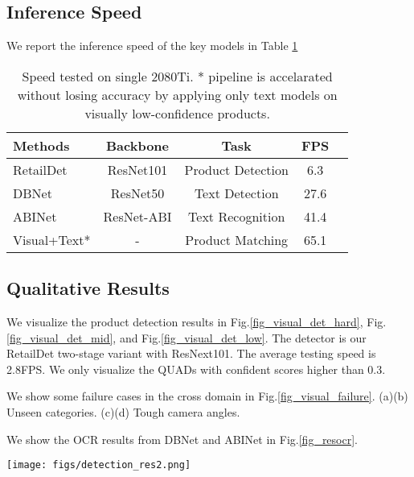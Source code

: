\documentclass[runningheads]{llncs}
\begin{document}
\subsection{Inference Speed}
We report the inference speed of the key models in Table \ref{table:Inferencetime}
\begin{table}[]
\centering
\begin{tabular}{l|cccc}
\hline \hline
Methods         & Backbone &Task                  & FPS   \\ \hline
RetailDet       & ResNet101 & Product Detection   & 6.3    \\
DBNet           & ResNet50 & Text Detection       & 27.6    \\
ABINet          & ResNet-ABI & Text Recognition     & 41.4   \\
Visual+Text*       & -   & Product Matching          &  65.1   \\
 \hline
\end{tabular}
\caption{Speed tested on single 2080Ti. * pipeline is accelarated without losing accuracy by applying only text models on visually low-confidence products.}
\label{table:Inferencetime}
\end{table}


\subsection{Qualitative Results}
We visualize the product detection results in Fig.\ref{fig_visual_det_hard}, Fig.\ref{fig_visual_det_mid}, and Fig.\ref{fig_visual_det_low}. The detector is our RetailDet two-stage variant with ResNext101. The average testing speed is 2.8FPS. We only visualize the QUADs with confident scores higher than 0.3. 

We show some failure cases in the cross domain in  Fig.\ref{fig_visual_failure}. (a)(b) Unseen categories. (c)(d) Tough camera angles.

We show the OCR results from DBNet and ABINet in Fig.\ref{fig_resocr}.










\begin{figure*}[t]
\centering
\texttt{[image: figs/detection\_res2.png]}
\caption{Visualization of high difficulty detection result from the RetailDet.}
\label{fig_visual_det_hard}
\end{figure*}
\end{document}
